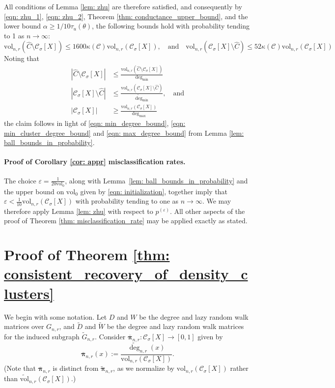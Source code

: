 \documentclass[11pt,twoside]{article}
\newcommand{\vol}{\mathrm{vol}}
\newcommand{\abs}[1]{\left \lvert #1 \right \rvert}
\newcommand{\1}{\mathbf{1}}
\newcommand{\pbf}{p}        %
\newcommand{\pibf}{\bm{\pi}}
\newcommand{\Xbf}{X}             %
\newcommand{\Wbf}{W}
\newcommand{\Dbf}{D}
\newcommand{\Cset}{\mathcal{C}}
\newcommand{\Csig}{\Cset_{\sigma}}
\newcommand{\degminwt}{\widetilde{\deg}_{\min}}
\newcommand{\degmax}{\deg_{\max}}
\newcommand{\degmin}{\deg_{\min}}
\begin{document}
All conditions of Lemma \ref{lem: zhu} are therefore satisfied, and consequently by \eqref{eqn: zhu_1}, \eqref{eqn: zhu_2}, Theorem \ref{thm: conductance_upper_bound}, and the lower bound $\alpha \geq 1/10\tau_u(\theta)$, the following bounds hold with probability tending to 1 as $n \to \infty$:
\begin{equation*}
\vol_{n,r}(\widehat{C} \setminus \Csig[\Xbf]) \leq 1600 \kappa(\Cset) \vol_{n,r}(\Csig[\Xbf]), \quad \textrm{and} \quad  \vol_{n,r}(\Csig[\Xbf] \setminus \widehat{C}) \leq 52 \kappa(\Cset) \vol_{n,r}(\Csig[\Xbf])
\end{equation*}
Noting that
\begin{align*}
\abs{\widehat{C} \setminus \Csig[\Xbf]} & \leq \frac{\vol_{n,r}(\widehat{C} \setminus \Csig[\Xbf])}{\degmin}   \\
\abs{\Csig[\Xbf] \setminus \widehat{C}} & \leq \frac{\vol_{n,r}(\Csig[\Xbf] \setminus \widehat{C})}{\degminwt}, \quad \textrm{and} \\
\abs{\Csig[\Xbf]} & \geq \frac{\vol_{n,r}(\Csig[\Xbf])}{\degmax}
\end{align*}
the claim follows in light of \eqref{eqn: min_degree_bound}, \eqref{eqn: min_cluster_degree_bound} and \eqref{eqn: max_degree_bound} from Lemma \ref{lem: ball_bounds_in_probability}.

\paragraph{Proof of Corollary \ref{cor: appr} misclassification rates.}

The choice $\varepsilon = \frac{1}{20 \vol_0}$, along with Lemma~\ref{lem: ball_bounds_in_probability} and the upper bound on $\vol_0$ given by \eqref{eqn: initialization}, together imply that $\varepsilon < \frac{1}{10}\vol_{n,r}(\Csig[\Xbf])$ with probability tending to one as $n \to \infty$. We may therefore apply Lemma \ref{lem: zhu} with respect to $\pbf^{(\varepsilon)}$. All other aspects of the proof of Theorem \ref{thm: misclassification_rate} may be applied exactly as stated.



\section{Proof of Theorem \ref{thm: consistent_recovery_of_density_clusters}}
\label{sec: proof_of_consistent_cluster_recovery}

We begin with some notation. Let $\Dbf$ and $\Wbf$ be the degree and lazy random walk matrices over $G_{n,r}$, and $\widetilde{\Dbf}$ and $\widetilde{\Wbf}$ be the degree and lazy random walk matrices for the induced subgraph $\widetilde{G}_{n,r}$. Consider $\overline{\pibf}_{n,r}: \Csig[\Xbf] \to [0,1]$ given by
\begin{equation*}
\overline{\pibf}_{n,r}(x) := \frac{\widetilde{\deg}_{n,r}(x)}{\vol_{n,r}(\Csig[\Xbf])}.
\end{equation*}
(Note that $\overline{\pibf}_{n,r}$ is distinct from $\widetilde{\pibf}_{n,r}$, as we normalize by $\vol_{n,r}(\Csig[\Xbf])$ rather than $\widetilde{\vol}_{n,r}(\Csig[\Xbf])$.)
\end{document}
